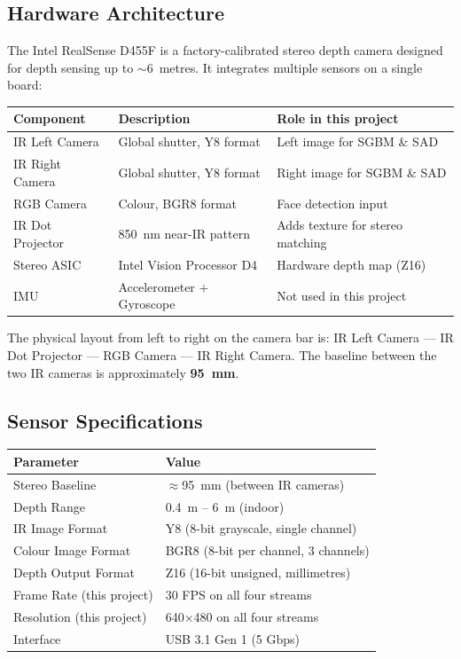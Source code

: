 \documentclass[12pt, a4paper]{article}
\begin{document}
\subsection{Hardware Architecture}

The Intel RealSense D455F is a factory-calibrated stereo depth camera designed
for depth sensing up to $\sim$6~metres. It integrates multiple sensors on a
single board:

\begin{center}
\begin{tabular}{lll}
  \toprule
  \textbf{Component} & \textbf{Description} & \textbf{Role in this project} \\
  \midrule
  IR Left Camera   & Global shutter, Y8 format   & Left image for SGBM \& SAD \\
  IR Right Camera  & Global shutter, Y8 format   & Right image for SGBM \& SAD \\
  RGB Camera       & Colour, BGR8 format          & Face detection input \\
  IR Dot Projector & 850~nm near-IR pattern       & Adds texture for stereo matching \\
  Stereo ASIC      & Intel Vision Processor D4    & Hardware depth map (Z16) \\
  IMU              & Accelerometer + Gyroscope    & Not used in this project \\
  \bottomrule
\end{tabular}
\end{center}

The physical layout from left to right on the camera bar is:
IR Left Camera --- IR Dot Projector --- RGB Camera --- IR Right Camera.
The baseline between the two IR cameras is approximately \textbf{95~mm}.

\subsection{Sensor Specifications}

\begin{center}
\begin{tabular}{ll}
  \toprule
  \textbf{Parameter} & \textbf{Value} \\
  \midrule
  Stereo Baseline         & $\approx$95~mm (between IR cameras) \\
  Depth Range             & 0.4~m -- 6~m (indoor) \\
  IR Image Format         & Y8 (8-bit grayscale, single channel) \\
  Colour Image Format     & BGR8 (8-bit per channel, 3 channels) \\
  Depth Output Format     & Z16 (16-bit unsigned, millimetres) \\
  Frame Rate (this project) & 30 FPS on all four streams \\
  Resolution (this project) & 640$\times$480 on all four streams \\
  Interface               & USB 3.1 Gen 1 (5 Gbps) \\
  \bottomrule
\end{tabular}
\end{center}
\end{document}

